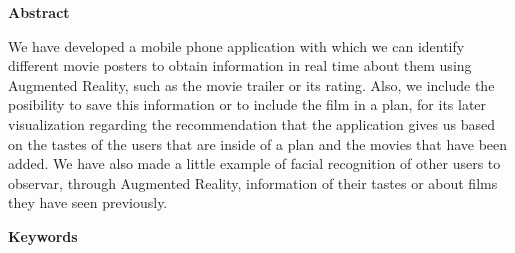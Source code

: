 
\newpage

\thispagestyle{empty}

\begin{center}

{\bf \Huge Abstract}

  \end{center}
\vspace{1cm}

We have developed a mobile phone application with which we can 
identify different movie posters to obtain information in real time about 
them using Augmented Reality, such as the movie trailer or its rating. Also,
we include the posibility to save this information or to include the film in a plan,
for its later visualization regarding the recommendation that the application gives us based
on the tastes of the users that are inside of a plan and the movies that have been 
added. We have also made a little example of facial recognition of other users to observar,
through Augmented Reality, information of their tastes or about films they have seen previously.

\vspace{1cm}

\begin{center}

  {\bf \Large Keywords}
  
     \end{center}
  
     \vspace{0.5cm}
     
